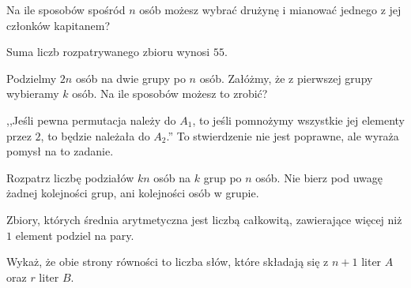 
\begin{hints_list}
	\item Na ile sposobów spośród $n$ osób możesz wybrać drużynę i mianować jednego z jej członków kapitanem?
	\item Suma liczb rozpatrywanego zbioru wynosi $55$.
	\item Podzielmy $2n$ osób na dwie grupy po $n$ osób. Załóżmy, że z pierwszej grupy wybieramy $k$ osób. Na ile sposobów możesz to zrobić?
	\item ,,Jeśli pewna permutacja należy do $A_1$, to jeśli pomnożymy wszystkie jej elementy przez $2$, to będzie należała do $A_2$.'' To stwierdzenie nie jest poprawne, ale wyraża pomysł na to zadanie.
	\item Rozpatrz liczbę podziałów $kn$ osób na $k$ grup po $n$ osób. Nie bierz pod uwagę żadnej kolejności grup, ani kolejności osób w grupie. 
	\item Zbiory, których średnia arytmetyczna jest liczbą całkowitą, zawierające więcej niż $1$ element podziel na pary.
	\item Wykaż, że obie strony równości to liczba słów, które składają się z $n + 1$ liter $A$ oraz $r$ liter $B$.
\end{hints_list}